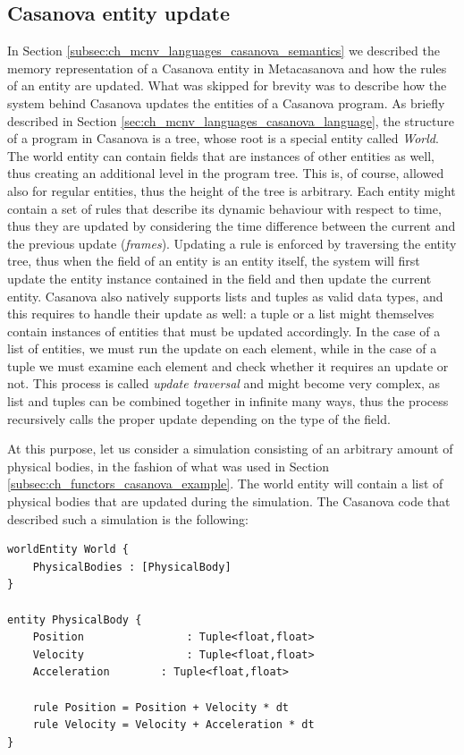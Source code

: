 \subsection{Casanova entity update}
\label{subsec:ch_networking_casanova_update}
In Section \ref{subsec:ch_mcnv_languages_casanova_semantics} we described the memory representation of a Casanova entity in Metacasanova and how the rules of an entity are updated. What was skipped for brevity was to describe how the system behind Casanova updates the entities of a Casanova program. As briefly described in Section \ref{sec:ch_mcnv_languages_casanova_language}, the structure of a program in Casanova is a tree, whose root is a special entity called \textit{World}. The world entity can contain fields that are instances of other entities as well, thus creating an additional level in the program tree. This is, of course, allowed also for regular entities, thus the height of the tree is arbitrary. Each entity might contain a set of rules that describe its dynamic behaviour with respect to time, thus they are updated by considering the time difference between the current and the previous update (\textit{frames}). Updating a rule is enforced by traversing the entity tree, thus when the field of an entity is an entity itself, the system will first update the entity instance contained in the field and then update the current entity. Casanova also natively supports lists and tuples as valid data types, and this requires to handle their update as well: a tuple or a list might themselves contain instances of entities that must be updated accordingly. In the case of a list of entities, we must run the update on each element, while in the case of a tuple we must examine each element and check whether it requires an update or not. This process is called \textit{update traversal} and might become very complex, as list and tuples can be combined together in infinite many ways, thus the process recursively calls the proper update depending on the type of the field.

At this purpose, let us consider a simulation consisting of an arbitrary amount of physical bodies, in the fashion of what was used in Section \ref{subsec:ch_functors_casanova_example}. The world entity will contain a list of physical bodies that are updated during the simulation. The Casanova code that described such a simulation is the following:

\begin{lstlisting}
worldEntity World {
	PhysicalBodies : [PhysicalBody]
}

entity PhysicalBody {
	Position				: Tuple<float,float>
	Velocity				: Tuple<float,float>
	Acceleration		: Tuple<float,float>
	
	rule Position = Position + Velocity * dt
	rule Velocity = Velocity + Acceleration * dt
}
\end{lstlisting}

